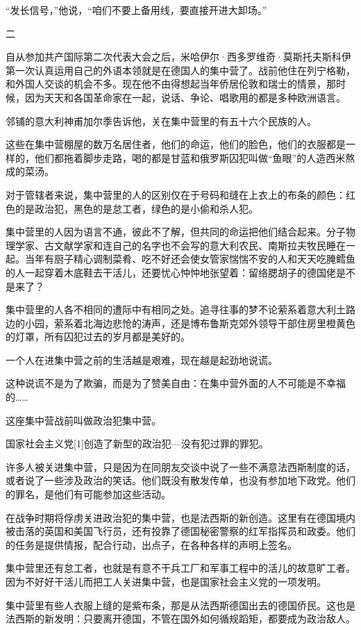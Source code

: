 “发长信号，”他说，“咱们不要上备用线，要直接开进大卸场。”

二

自从参加共产国际第二次代表大会之后，米哈伊尔·西多罗维奇·莫斯托夫斯科伊第一次认真运用自己的外语本领就是在德国人的集中营了。战前他住在列宁格勒，和外国人交谈的机会不多。现在他不由得想起当年侨居伦敦和瑞士的情景，那时候，因为天天和各国革命家在一起，说话、争论、唱歌用的都是多种欧洲语言。

邻铺的意大利神甫加尔季告诉他，关在集中营里的有五十六个民族的人。

这些在集中营棚屋的数万名居住者，他们的命运，他们的脸色，他们的衣服都是一样的，他们都拖着脚步走路，喝的都是甘蓝和俄罗斯囚犯叫做“鱼眼”的人造西米熬成的菜汤。

对于管辖者来说，集中营里的人的区别仅在于号码和缝在上衣上的布条的颜色：红色的是政治犯，黑色的是怠工者，绿色的是小偷和杀人犯。

集中营里的人因为语言不通，彼此不了解，但共同的命运把他们结合起来。分子物理学家、古文献学家和连自己的名字也不会写的意大利农民、南斯拉夫牧民睡在一起。当年有厨子精心调制菜肴、吃不好还会使女管家惴惴不安的人和天天吃腌鳕鱼的人一起穿着木底鞋去干活儿，还要忧心忡忡地张望着：留络腮胡子的德国佬是不是来了？

集中营里的人各不相同的遭际中有相同之处。追寻往事的梦不论萦系着意大利土路边的小园，萦系着北海边悲怆的涛声，还是博布鲁斯克郊外领导干部住房里橙黄色的灯罩，所有囚犯过去的岁月都是美好的。

一个人在进集中营之前的生活越是艰难，现在越是起劲地说谎。

这种说谎不是为了欺骗，而是为了赞美自由：在集中营外面的人不可能是不幸福的……

这座集中营战前叫做政治犯集中营。

国家社会主义党[1]创造了新型的政治犯—没有犯过罪的罪犯。

许多人被关进集中营，只是因为在同朋友交谈中说了一些不满意法西斯制度的话，或者说了一些涉及政治的笑话。他们既没有散发传单，也没有参加地下政党。他们的罪名，是他们有可能参加这些活动。

在战争时期将俘虏关进政治犯的集中营，也是法西斯的新创造。这里有在德国境内被击落的英国和美国飞行员，还有投靠了德国秘密警察的红军指挥员和政委。他们的任务是提供情报，配合行动，出点子，在各种各样的声明上签名。

集中营里还有怠工者，也就是有意不干兵工厂和军事工程中的活儿的故意旷工者。因为不好好干活儿而把工人关进集中营，也是国家社会主义党的一项发明。

集中营里有些人衣服上缝的是紫布条，那是从法西斯德国出去的德国侨民。这也是法西斯的新发明：只要离开德国，不管在国外如何循规蹈矩，都要成为政治敌人。

